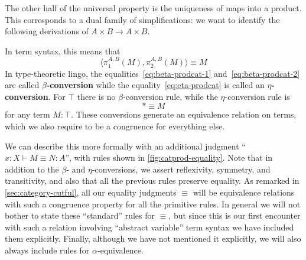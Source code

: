 \documentclass{book}
\let\types\vdash
\def\unit{\top}%
\def\ttt{\mathord{\ast}}%
\def\pair#1#2{\langle #1,#2\rangle}
\def\pr#1#2#3{\pi_{#1}^{#2,#3}}
\begin{document}
The other half of the universal property is the uniqueness of maps into a product.
This corresponds to a dual family of simplifications: we want to identify the following derivations of $A\times B\to A\times B$.
In term syntax, this means that
\begin{equation}
  \pair{\pr1AB(M)}{\pr2AB(M)} \equiv M\label{eq:eta-prodcat}
\end{equation}
In type-theoretic lingo, the equalities~\eqref{eq:beta-prodcat-1} and~\eqref{eq:beta-prodcat-2} are called \textbf{$\beta$-conversion} while the equality~\eqref{eq:eta-prodcat} is called an \textbf{$\eta$-conversion}.
For $\unit$ there is no $\beta$-conversion rule, while the $\eta$-conversion rule is
\begin{equation}\label{eq:eta-unit}
  \ttt \equiv M
\end{equation}
for any term $M:\unit$.
These conversions generate an equivalence relation on terms, which we also require to be a congruence for everything else.

We can describe this more formally with an additional judgment ``$x:X\types M\equiv N :A$'', with rules shown in  \cref{fig:catprod-equality}.
Note that in addition to the $\beta$- and $\eta$-conversions, we assert reflexivity, symmetry, and transitivity, and also that all the previous rules preserve equality.
As remarked in \cref{sec:category-cutful}, all our equality judgments $\equiv$ will be equivalence relations with such a congruence property for all the primitive rules.
In general we will not bother to state these ``standard'' rules for $\equiv$, but since this is our first encounter with such a relation involving ``abstract variable'' term syntax we have included them explicitly.
Finally, although we have not mentioned it explicitly, we will also always include rules for $\alpha$-equivalence.
\end{document}
